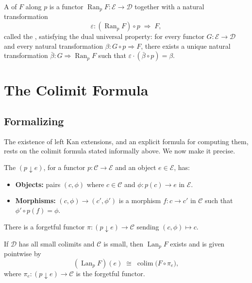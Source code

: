 \begin{definition}
A  of $F$ along $p$ is a functor
$\operatorname{Ran}_p F : \mathcal{E} \to \mathcal{D}$ together with a natural
transformation
\[
  \varepsilon : (\operatorname{Ran}_p F) \circ p \;\Rightarrow\; F,
\]
called the , satisfying the dual universal property: for every functor
$G : \mathcal{E} \to \mathcal{D}$ and every natural transformation
$\beta : G \circ p \Rightarrow F$, there exists a unique natural transformation
$\bar{\beta} : G \Rightarrow \operatorname{Ran}_p F$ such that
$\varepsilon \cdot (\bar{\beta} \circ p) = \beta$.
\end{definition}

\section{The Colimit Formula}

\subsection{Formalizing}

The existence of left Kan extensions, and an explicit formula for computing them,
rests on the colimit formula stated informally above. We now make it precise.

\begin{definition}
The  $(p \downarrow e)$, for a functor
$p : \mathcal{C} \to \mathcal{E}$ and an object $e \in \mathcal{E}$, has:
\begin{itemize}
  \item \textbf{Objects:} pairs $(c, \phi)$ where $c \in \mathcal{C}$ and
    $\phi : p(c) \to e$ in $\mathcal{E}$.
  \item \textbf{Morphisms:} $(c, \phi) \to (c', \phi')$ is a morphism
    $f : c \to c'$ in $\mathcal{C}$ such that $\phi' \circ p(f) = \phi$.
\end{itemize}
There is a forgetful functor $\pi : (p \downarrow e) \to \mathcal{C}$
sending $(c, \phi) \mapsto c$.
\end{definition}

\begin{theorem}
If $\mathcal{D}$ has all small colimits and $\mathcal{C}$ is small, then
$\operatorname{Lan}_p F$ exists and is given pointwise by
\[
  (\operatorname{Lan}_p F)(e) \;\cong\; \operatorname{colim}\bigl(F \circ \pi_{e}\bigr),
\]
where $\pi_e : (p \downarrow e) \to \mathcal{C}$ is the forgetful functor.
\end{theorem}

